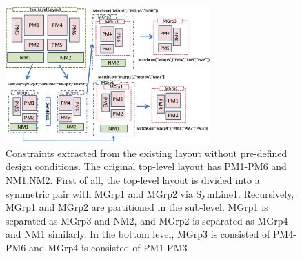     \begin{figure}[ht]
      \centering
      \includegraphics[width=0.7\textwidth]{Fig/CG/CGExtract.eps}
      \caption{Constraints extracted from the existing layout without pre-defined design conditions. The original top-level layout has PM1-PM6 and NM1,NM2. First of all, the top-level layout is divided into a symmetric pair with MGrp1 and MGrp2 via SymLine1. Recursively, MGrp1 and MGrp2 are partitioned in the sub-level. MGrp1 is separated as MGrp3 and NM2, and MGrp2 is separated as MGrp4 and NM1 similarly. In the bottom level, MGrp3 is consisted of PM4-PM6 and MGrp4 is consisted of PM1-PM3}
      \label{fig:CGExtract}
    \end{figure}




